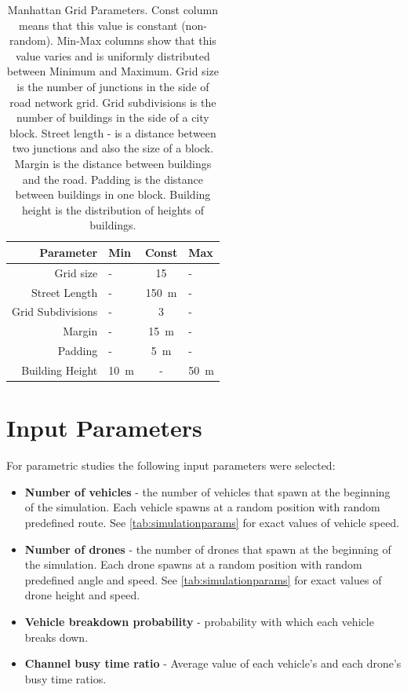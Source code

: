 \documentclass[]{nsm-thesis}
\begin{document}
\begin{table}
    \centering
    \begin{tabular}{rlcl}
        \toprule
        Parameter & Min & Const & Max \\
        \midrule
        	Grid size & - & 15 & - \\
        	Street Length & - & \SI{150}{\meter} & - \\
		Grid Subdivisions & - & 3 & - \\
		Margin & - & \SI{15}{\meter} & - \\
		Padding & - & \SI{5}{\meter} & - \\
		Building Height & \SI{10}{\meter} & - & \SI{50}{\meter} \\
        \bottomrule
    \end{tabular}
    \caption{Manhattan Grid Parameters. Const column means that this value is constant (non-random). Min-Max columns show that this value varies and is uniformly distributed between Minimum and Maximum. Grid size is the number of junctions in the side of road network grid. Grid subdivisions is the number of buildings in the side of a city block. Street length - is a distance between two junctions and also the size of a block. Margin is the distance between buildings and the road. Padding is the distance between buildings in one block. Building height is the distribution of heights of buildings. }
    \label{tab:manhattangrid}
\end{table}

\section{Input Parameters}

For parametric studies the following input parameters were selected:

\begin{itemize}

	\item \textbf{Number of vehicles} - the number of vehicles that spawn at the beginning of the simulation. Each vehicle spawns at a random position with random predefined route. See \cref{tab:simulationparams} for exact values of vehicle speed.
	
	\item \textbf{Number of drones} - the number of drones that spawn at the beginning of the simulation. Each drone spawns at a random position with random predefined angle and speed. See \cref{tab:simulationparams} for exact values of drone height and speed.
	
	\item \textbf{Vehicle breakdown probability} - probability with which each vehicle breaks down.

	\item \textbf{Channel busy time ratio} - Average value of each vehicle's and each drone's busy time ratios.
\end{itemize}
\end{document}
